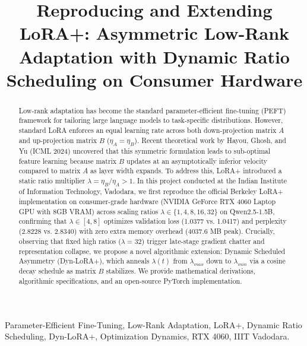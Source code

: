 \documentclass[conference]{IEEEtran}
\begin{document}
\title{Reproducing and Extending LoRA+: Asymmetric Low-Rank Adaptation with Dynamic Ratio Scheduling on Consumer Hardware}

\author{
}

\maketitle

\begin{abstract}
Low-rank adaptation has become the standard parameter-efficient fine-tuning (PEFT) framework for tailoring large language models to task-specific distributions. However, standard LoRA enforces an equal learning rate across both down-projection matrix $A$ and up-projection matrix $B$ ($\eta_A = \eta_B$). Recent theoretical work by Hayou, Ghosh, and Yu (ICML 2024) uncovered that this symmetric formulation leads to sub-optimal feature learning because matrix $B$ updates at an asymptotically inferior velocity compared to matrix $A$ as layer width expands. To address this, LoRA+ introduced a static ratio multiplier $\lambda = \eta_B / \eta_A > 1$. In this project conducted at the Indian Institute of Information Technology, Vadodara, we first reproduce the official Berkeley LoRA+ implementation on consumer-grade hardware (NVIDIA GeForce RTX 4060 Laptop GPU with 8GB VRAM) across scaling ratios $\lambda \in \{1, 4, 8, 16, 32\}$ on Qwen2.5-1.5B, confirming that $\lambda \in [4, 8]$ optimizes validation loss (1.0377 vs. 1.0417) and perplexity (2.8228 vs. 2.8340) with zero extra memory overhead (4037.6 MB peak). Crucially, observing that fixed high ratios ($\lambda=32$) trigger late-stage gradient chatter and representation collapse, we propose a novel algorithmic extension: Dynamic Scheduled Asymmetry (Dyn-LoRA+), which anneals $\lambda(t)$ from $\lambda_{max}$ down to $\lambda_{min}$ via a cosine decay schedule as matrix $B$ stabilizes. We provide mathematical derivations, algorithmic specifications, and an open-source PyTorch implementation.
\end{abstract}

\begin{IEEEkeywords}
Parameter-Efficient Fine-Tuning, Low-Rank Adaptation, LoRA+, Dynamic Ratio Scheduling, Dyn-LoRA+, Optimization Dynamics, RTX 4060, IIIT Vadodara.
\end{IEEEkeywords}
\end{document}
